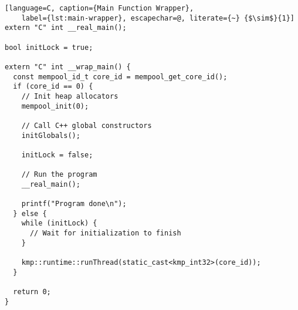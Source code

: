 \begin{lstlisting}[language=C, caption={Main Function Wrapper},
	label={lst:main-wrapper}, escapechar=@, literate={~} {$\sim$}{1}]
extern "C" int __real_main();

bool initLock = true;

extern "C" int __wrap_main() {
  const mempool_id_t core_id = mempool_get_core_id();
  if (core_id == 0) {
    // Init heap allocators
    mempool_init(0);

    // Call C++ global constructors
    initGlobals();

    initLock = false;

    // Run the program
    __real_main();

    printf("Program done\n");
  } else {
    while (initLock) {
      // Wait for initialization to finish
    }

    kmp::runtime::runThread(static_cast<kmp_int32>(core_id));
  }

  return 0;
}
\end{lstlisting}
